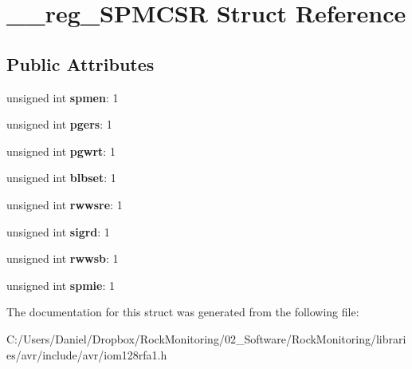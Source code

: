 \hypertarget{struct____reg___s_p_m_c_s_r}{}\section{\+\_\+\+\_\+reg\+\_\+\+S\+P\+M\+C\+SR Struct Reference}
\label{struct____reg___s_p_m_c_s_r}
\subsection*{Public Attributes}
\begin{DoxyCompactItemize}
\item 
unsigned int {\bfseries spmen}\+: 1\hypertarget{struct____reg___s_p_m_c_s_r_abde70877b3f0337d6537fffecdda9241}{}\label{struct____reg___s_p_m_c_s_r_abde70877b3f0337d6537fffecdda9241}

\item 
unsigned int {\bfseries pgers}\+: 1\hypertarget{struct____reg___s_p_m_c_s_r_a9a786a15b01ad8eb86c0905523332678}{}\label{struct____reg___s_p_m_c_s_r_a9a786a15b01ad8eb86c0905523332678}

\item 
unsigned int {\bfseries pgwrt}\+: 1\hypertarget{struct____reg___s_p_m_c_s_r_aff653c9ee438fda56256a9cc976baed5}{}\label{struct____reg___s_p_m_c_s_r_aff653c9ee438fda56256a9cc976baed5}

\item 
unsigned int {\bfseries blbset}\+: 1\hypertarget{struct____reg___s_p_m_c_s_r_aa4e61c4b485151b3c26de4eeb77eccb3}{}\label{struct____reg___s_p_m_c_s_r_aa4e61c4b485151b3c26de4eeb77eccb3}

\item 
unsigned int {\bfseries rwwsre}\+: 1\hypertarget{struct____reg___s_p_m_c_s_r_a20354521823fb15a1061eef08bdc6a83}{}\label{struct____reg___s_p_m_c_s_r_a20354521823fb15a1061eef08bdc6a83}

\item 
unsigned int {\bfseries sigrd}\+: 1\hypertarget{struct____reg___s_p_m_c_s_r_a99c61c53872987b1d437851b1d29693d}{}\label{struct____reg___s_p_m_c_s_r_a99c61c53872987b1d437851b1d29693d}

\item 
unsigned int {\bfseries rwwsb}\+: 1\hypertarget{struct____reg___s_p_m_c_s_r_a09dbc76edb2a58447d86dfa581e89323}{}\label{struct____reg___s_p_m_c_s_r_a09dbc76edb2a58447d86dfa581e89323}

\item 
unsigned int {\bfseries spmie}\+: 1\hypertarget{struct____reg___s_p_m_c_s_r_a522c33d01e8dda61686ceb728fc8b1ec}{}\label{struct____reg___s_p_m_c_s_r_a522c33d01e8dda61686ceb728fc8b1ec}

\end{DoxyCompactItemize}


The documentation for this struct was generated from the following file\+:\begin{DoxyCompactItemize}
\item 
C\+:/\+Users/\+Daniel/\+Dropbox/\+Rock\+Monitoring/02\+\_\+\+Software/\+Rock\+Monitoring/libraries/avr/include/avr/iom128rfa1.\+h\end{DoxyCompactItemize}
